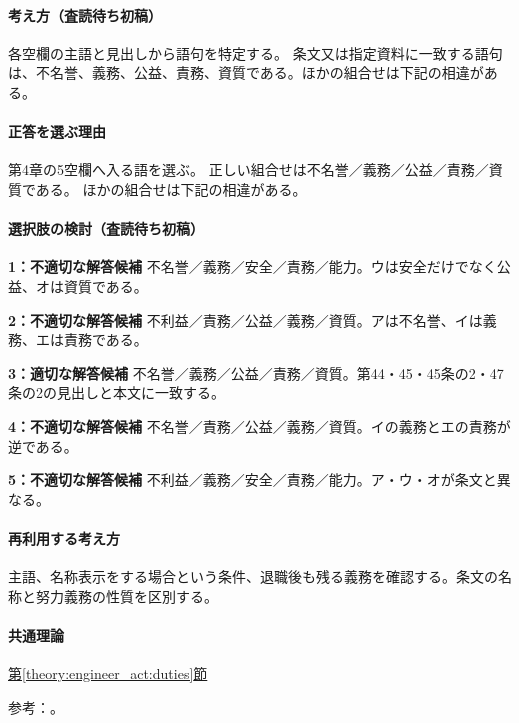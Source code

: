 \paragraph{考え方（査読待ち初稿）} 各空欄の主語と見出しから語句を特定する。 条文又は指定資料に一致する語句は、不名誉、義務、公益、責務、資質である。ほかの組合せは下記の相違がある。

\paragraph{正答を選ぶ理由} 第4章の5空欄へ入る語を選ぶ。 正しい組合せは不名誉／義務／公益／責務／資質である。 ほかの組合せは下記の相違がある。

\paragraph{選択肢の検討（査読待ち初稿）}

\noindent\textbf{1：不適切な解答候補} 不名誉／義務／安全／責務／能力。ウは安全だけでなく公益、オは資質である。\par

\noindent\textbf{2：不適切な解答候補} 不利益／責務／公益／義務／資質。アは不名誉、イは義務、エは責務である。\par

\noindent\textbf{3：適切な解答候補} 不名誉／義務／公益／責務／資質。第44・45・45条の2・47条の2の見出しと本文に一致する。\par

\noindent\textbf{4：不適切な解答候補} 不名誉／責務／公益／義務／資質。イの義務とエの責務が逆である。\par

\noindent\textbf{5：不適切な解答候補} 不利益／義務／安全／責務／能力。ア・ウ・オが条文と異なる。\par

\paragraph{再利用する考え方} 主語、名称表示をする場合という条件、退職後も残る義務を確認する。条文の名称と努力義務の性質を区別する。

\paragraph{共通理論} \hyperref[theory:engineer_act:duties]{第\ref*{theory:engineer_act:duties}節}

\par 参考：\cite{engineer_act_current}。


